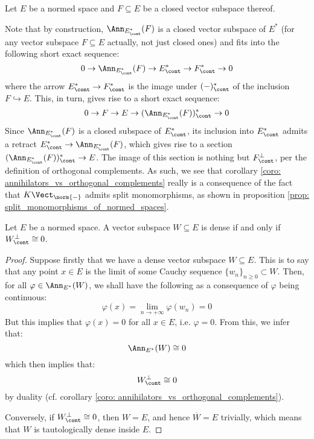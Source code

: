         \begin{remark}
            Let $E$ be a normed space and $F \subseteq E$ be a closed vector subspace thereof.
        
            Note that by construction, $\Ann_{E^*_{\cont}}(F)$ is a closed vector subspace of $E^*$ (for any vector subspace $F \subseteq E$ actually, not just closed ones) and fits into the following short exact sequence:
                $$0 \to \Ann_{E^*_{\cont}}(F) \to E^*_{\cont} \to F^*_{\cont} \to 0$$
            where the arrow $E^*_{\cont} \to F^*_{\cont}$ is the image under $(-)^*_{\cont}$ of the inclusion $F \hookrightarrow E$. This, in turn, gives rise to a short exact sequence:
                $$0 \to F \to E \to ( \Ann_{E^*_{\cont}}(F) )^*_{\cont} \to 0$$
            Since $\Ann_{E^*_{\cont}}(F)$ is a closed subspace of $E^*_{\cont}$, its inclusion into $E^*_{\cont}$ admits a retract $E^*_{\cont} \to \Ann_{E^*_{\cont}}(F)$, which gives rise to a section $( \Ann_{E^*_{\cont}}(F) )^*_{\cont} \to E$. The image of this section is nothing but $F^{\perp}_{\cont}$, per the definition of orthogonal complements. As such, we see that corollary \ref{coro: annihilators_vs_orthogonal_complements} really is a consequence of the fact that $K\-\Vect_{\norm{-}}$ admits split monomorphisms, as shown in proposition \ref{prop: split_monomorphisms_of_normed_spaces}.
        \end{remark}
        
        \begin{lemma} \label{lemma: density_orthogonal_complement_criterion}
            Let $E$ be a normed space. A vector subspace $W \subseteq E$ is dense if and only if $W^{\perp}_{\cont} \cong 0$.
        \end{lemma}
            \begin{proof}
                Suppose firstly that we have a dense vector subspace $W \subseteq E$. This is to say that any point $x \in E$ is the limit of some Cauchy sequence $\{w_n\}_{n \geq 0} \subset W$. Then, for all $\varphi \in \Ann_{E^*}(W)$, we shall have the following as a consequence of $\varphi$ being continuous:
                    $$\varphi(x) = \lim_{n \to +\infty} \varphi(w_n) = 0$$
                But this implies that $\varphi(x) = 0$ for all $x \in E$, i.e. $\varphi = 0$. From this, we infer that:
                    $$\Ann_{E^*}(W) \cong 0$$
                which then implies that:
                    $$W^{\perp}_{\cont} \cong 0$$
                by duality (cf. corollary \ref{coro: annihilators_vs_orthogonal_complements}).

                Conversely, if $W^{\perp}_{\cont} \cong 0$, then $W = E$, and hence $\overline{W} = E$ trivially, which means that $W$ is tautologically dense inside $E$.
            \end{proof}

